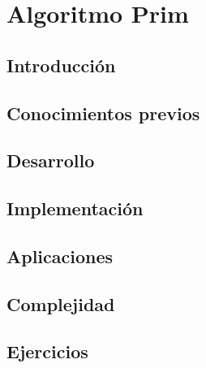 \chapter{Algoritmo Prim}
\section{Introducción}

\section{Conocimientos previos}

\section{Desarrollo}

\section{Implementación}

\section{Aplicaciones}

\section{Complejidad}

\section{Ejercicios}

